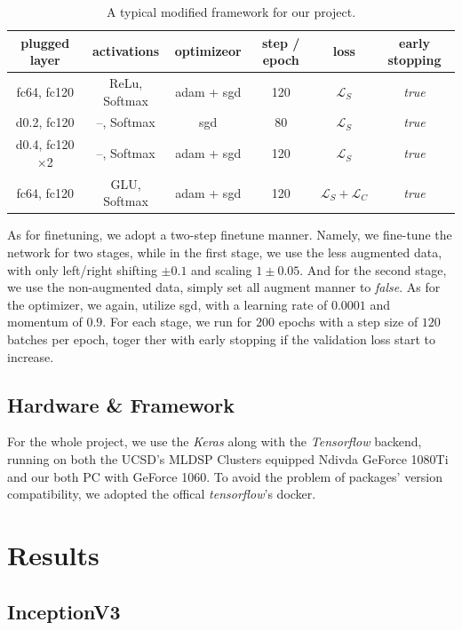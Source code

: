 \documentclass{article}
\begin{document}
\begin{table}[h]
	\centering
	\caption{A typical modified framework for our project.}
	\label{tab:2}
	\begin{tabular}{c|ccccc}
		\toprule
		 plugged layer & activations & optimizeor & step / epoch & loss & early stopping\\ 
		\midrule
		 fc64, fc120 & ReLu, Softmax & adam + sgd & 120 & $\mathcal{L}_S$ & \emph{true} \\ 
		 d0.2, fc120 & --, Softmax & sgd & 80 & $\mathcal{L}_S$ & \emph{true} \\ 
		 d0.4, fc120$\times$2 & --, Softmax & adam + sgd & 120 & $\mathcal{L}_S$ & \emph{true} \\
		 fc64, fc120 & GLU, Softmax & adam + sgd & 120  & $\mathcal{L}_S + \mathcal{L}_C$ & \emph{true} \\ 
		\bottomrule
	\end{tabular}
\end{table}

As for finetuning, we adopt a two-step finetune manner. 
Namely, we fine-tune the network for two stages, while in the first stage, we use the less augmented data, with only left/right shifting $\pm 0.1$ and scaling $1\pm0.05$. 
And for the second stage, we use the non-augmented data, simply set all augment manner to \emph{false}. 
As for the optimizer, we again, utilize sgd, with a learning rate of $0.0001$ and momentum of $0.9$. 
For each stage, we run for $200$ epochs with a step size of $120$ batches per epoch, toger ther with early stopping if the validation loss start to increase. 

\subsection{Hardware \& Framework}
For the whole project, we use the \emph{Keras} along with the \emph{Tensorflow} backend, running on both the UCSD's MLDSP Clusters equipped Ndivda GeForce 1080Ti and our both PC with GeForce 1060. 
To avoid the problem of packages' version compatibility, we adopted the offical \emph{tensorflow}'s docker. 

\newpage
\section{Results}

\subsection{InceptionV3}
\end{document}
